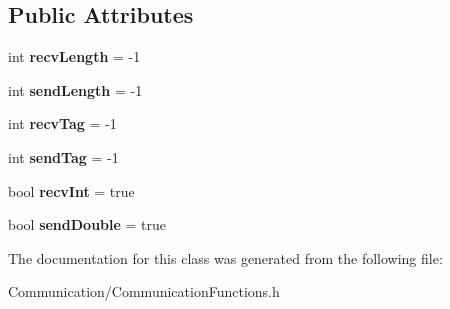 \subsection*{Public Attributes}
\begin{DoxyCompactItemize}
\item 
\mbox{\label{classFieldRequestObject_a2ad6c3d99c94c58a9420643d3e0b653d}} 
int {\bfseries recv\+Length} = -\/1
\item 
\mbox{\label{classFieldRequestObject_a43659bae4495b2924f15e31c05bbe4b7}} 
int {\bfseries send\+Length} = -\/1
\item 
\mbox{\label{classFieldRequestObject_a403abbe6c557055936bc46d7587f78ed}} 
int {\bfseries recv\+Tag} = -\/1
\item 
\mbox{\label{classFieldRequestObject_ad7e1aa4729c8b9ac854975e90cbb5cfb}} 
int {\bfseries send\+Tag} = -\/1
\item 
\mbox{\label{classFieldRequestObject_a6f900d722138b5826988f49375ff4689}} 
bool {\bfseries recv\+Int} = true
\item 
\mbox{\label{classFieldRequestObject_aeed51f8a97bf6175052c899525482ad9}} 
bool {\bfseries send\+Double} = true
\end{DoxyCompactItemize}


The documentation for this class was generated from the following file\+:\begin{DoxyCompactItemize}
\item 
Communication/Communication\+Functions.\+h\end{DoxyCompactItemize}
